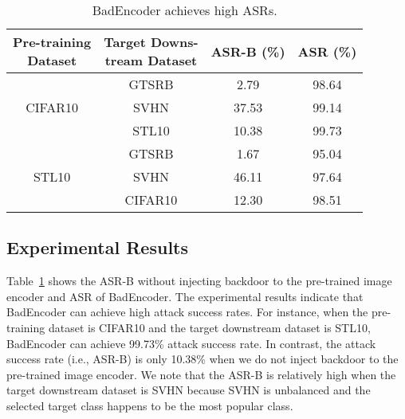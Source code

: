 \begin{table}[tp]\renewcommand{\arraystretch}{1.2} 
	\centering
	
	\caption{BadEncoder achieves high ASRs.}
	\begin{tabular}{|c|c|c|c|}
		\hline
	\makecell{Pre-training \\Dataset}& \makecell{ Target Downs-\\tream Dataset }& ASR-B (\%)	 & ASR (\%)  \\ \hline
	\multirow{3}{*}{CIFAR10}
	&	GTSRB  & 2.79 & 98.64  \\ \cline{2-4} 
	&	SVHN & 37.53 & 99.14  \\ \cline{2-4} 
	&	STL10 & 10.38 & 99.73  \\ \hline
	
	\multirow{3}{*}{STL10}
	&	GTSRB  & 1.67 & 95.04  \\ \cline{2-4} 
	&	SVHN  & 46.11 & 97.64  \\ \cline{2-4} 
	&	CIFAR10  & 12.30 & 98.51  \\ \hline
	\end{tabular}
	\label{highasr_table} 
	\vspace{-4mm}
\end{table}













\subsection{Experimental Results}
\vspace{-2mm}
 Table~\ref{highasr_table} shows the ASR-B without injecting backdoor to the pre-trained image encoder and ASR of BadEncoder. The experimental results indicate that BadEncoder can achieve high attack success rates. For instance, when the pre-training dataset is CIFAR10 and the target downstream dataset is STL10, BadEncoder can achieve 99.73\% attack success rate. In contrast, the attack success rate (i.e., ASR-B) is only  10.38\% when we do not inject backdoor to the pre-trained image encoder. We note that the ASR-B is relatively high when the target downstream dataset is SVHN because SVHN is unbalanced and the selected target class happens to be the most popular class. 

